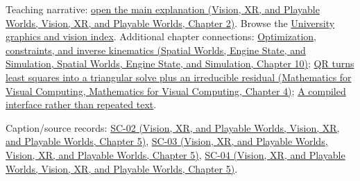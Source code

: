 Teaching narrative: \href{../07-Vision-XR-and-Playable-Worlds/main.pdf\#nameddest=04-visual-computing-ii-ch031-learning-a-visual-classifier-from-examples}{open the main explanation (Vision, XR, and Playable Worlds, Vision, XR, and Playable Worlds, Chapter 2)}. Browse the \hyperref[appendix-a6d556a4ef50-university-graphics-vision-and-photography---independent-series]{University graphics and vision index}. Additional chapter connections: \href{../05-Spatial-Worlds-Engine-State-and-Simulation/main.pdf\#nameddest=04-visual-computing-ii-ch029-optimization-constraints-and-inverse-kinematics}{Optimization, constraints, and inverse kinematics (Spatial Worlds, Engine State, and Simulation, Spatial Worlds, Engine State, and Simulation, Chapter 10)}; \href{../02-Mathematics-for-Visual-Computing/main.pdf\#nameddest=01-foundations-i-ch020-qr-turns-least-squares-into-a-triangular-solve-plus-an-irreducible-residual}{QR turns least squares into a triangular solve plus an irreducible residual (Mathematics for Visual Computing, Mathematics for Visual Computing, Chapter 4)}; \hyperref[01-foundations-i-ch002-a-compiled-interface-rather-than-repeated-text]{A compiled interface rather than repeated text}.

Caption/source records: \href{../07-Vision-XR-and-Playable-Worlds/main.pdf\#nameddest=04-visual-computing-ii-ch036-sc-02---stanford-cs231n-spring-2025-lecture-2-image-classification-with-linear-classifiers}{SC-02 (Vision, XR, and Playable Worlds, Vision, XR, and Playable Worlds, Chapter 5)}, \href{../07-Vision-XR-and-Playable-Worlds/main.pdf\#nameddest=04-visual-computing-ii-ch036-sc-03---stanford-cs231n-spring-2025-lecture-3-regularization-and-optimization}{SC-03 (Vision, XR, and Playable Worlds, Vision, XR, and Playable Worlds, Chapter 5)}, \href{../07-Vision-XR-and-Playable-Worlds/main.pdf\#nameddest=04-visual-computing-ii-ch036-sc-04---stanford-cs231n-spring-2025-lecture-4-neural-networks-and-backpropagation}{SC-04 (Vision, XR, and Playable Worlds, Vision, XR, and Playable Worlds, Chapter 5)}.
